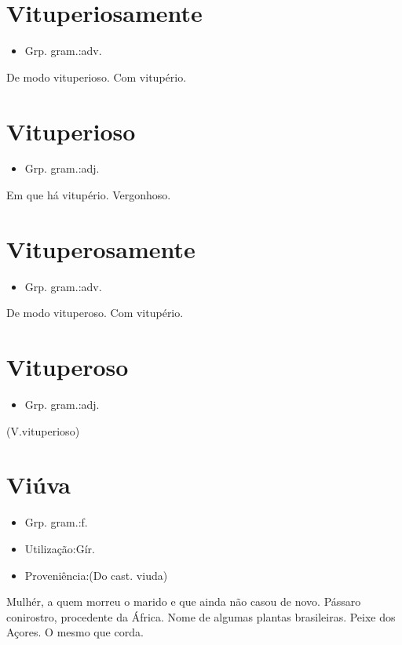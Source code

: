 \documentclass{article}
\begin{document}
\section{Vituperiosamente}
\begin{itemize}
\item {Grp. gram.:adv.}
\end{itemize}
De modo vituperioso.
Com vitupério.
\section{Vituperioso}
\begin{itemize}
\item {Grp. gram.:adj.}
\end{itemize}
Em que há vitupério.
Vergonhoso.
\section{Vituperosamente}
\begin{itemize}
\item {Grp. gram.:adv.}
\end{itemize}
De modo vituperoso.
Com vitupério.
\section{Vituperoso}
\begin{itemize}
\item {Grp. gram.:adj.}
\end{itemize}
(V.vituperioso)
\section{Viúva}
\begin{itemize}
\item {Grp. gram.:f.}
\end{itemize}
\begin{itemize}
\item {Utilização:Gír.}
\end{itemize}
\begin{itemize}
\item {Proveniência:(Do cast. \textunderscore viuda\textunderscore )}
\end{itemize}
Mulhér, a quem morreu o marido e que ainda não casou de novo.
Pássaro conirostro, procedente da África.
Nome de algumas plantas brasileiras.
Peixe dos Açores.
O mesmo que \textunderscore corda\textunderscore .
\end{document}
